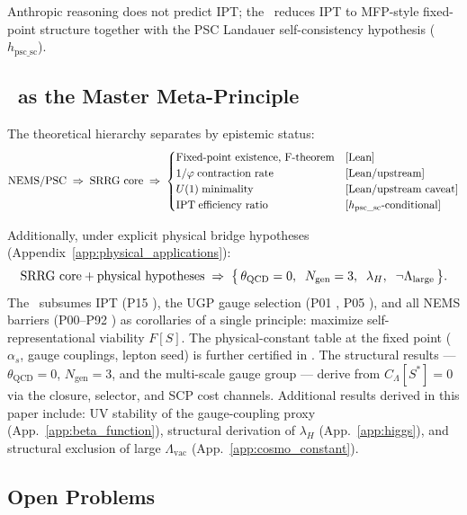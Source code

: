 \documentclass[11pt]{article}
\theoremstyle{remark}
\newcommand{\SRRG}{\text{SRRG}}
\newcommand{\IPT}{\mathrm{IPT}}
\newcommand{\Sstar}{S^*}
\newcommand{\goldenratio}{\varphi}
\begin{document}
Anthropic reasoning does not predict IPT; the \SRRG\ reduces IPT to MFP-style fixed-point structure together with
the PSC Landauer self-consistency hypothesis ($h_{\mathrm{psc\_sc}}$).

\subsection{\SRRG\ as the Master Meta-Principle}
\label{sec:meta}

The theoretical hierarchy separates by epistemic status:
\[
\text{NEMS/PSC} \;\Rightarrow\; \text{\SRRG\ core}
\;\Rightarrow\;
\begin{cases}
\text{Fixed-point existence, F-theorem} & \text{[Lean]} \\
1/\goldenratio\;\text{contraction rate} & \text{[Lean/upstream]} \\
U(1)\;\text{minimality} & \text{[Lean/upstream caveat]} \\
\IPT\;\text{efficiency ratio} & [h_{\mathrm{psc\_sc}}\text{-conditional}]
\end{cases}
\]

Additionally, under explicit physical bridge hypotheses (Appendix~\ref{app:physical_applications}):
\[
\text{\SRRG\ core} + \text{physical hypotheses}
\;\Rightarrow\;
\bigl\{\,\theta_{\mathrm{QCD}}=0,\;\; N_{\mathrm{gen}}=3,\;\;
\lambda_H,\;\; \neg\Lambda_{\mathrm{large}}\,\bigr\}.
\]
The \SRRG\ subsumes IPT (P15 \cite{SpivackIPT}), the UGP gauge selection
(P01 \cite{Spivack2025_FirstPrinciplesSM}, P05 \cite{SpivackNEMS05}), and all NEMS
barriers (P00--P92 \cite{SpivackNEMSHub}) as corollaries of a single principle: maximize
self-representational viability $F[S]$.  The physical-constant table at the fixed point
($\alpha_s$, gauge couplings, lepton seed) is further certified in
\cite{SpivackUnifiedRigidity,SpivackUGPFormalization}.
The structural results --- $\theta_{\mathrm{QCD}}=0$, $N_{\mathrm{gen}}=3$,
and the multi-scale gauge group --- derive from $C_\Lambda[\Sstar]=0$ via the closure,
selector, and SCP cost channels.  Additional results derived in this paper include:
UV stability of the gauge-coupling
proxy (App.~\ref{app:beta_function}), structural derivation of $\lambda_H$
(App.~\ref{app:higgs}), and structural exclusion of large $\Lambda_{\mathrm{vac}}$
(App.~\ref{app:cosmo_constant}).

\subsection{Open Problems}
\label{sec:open}
\end{document}
